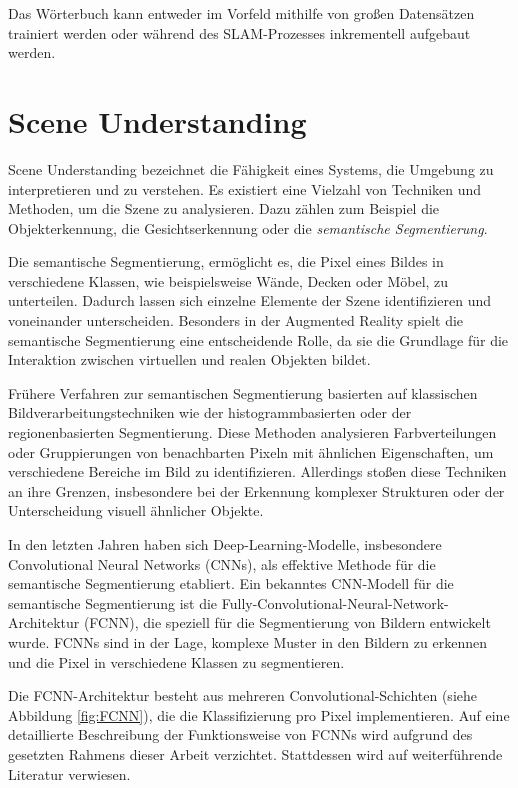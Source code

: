 Das Wörterbuch kann entweder im Vorfeld mithilfe von großen Datensätzen trainiert werden oder während des SLAM-Prozesses inkrementell aufgebaut werden. \cite{ta2023loopClosure, khan2015ibuild, gao2021vSLAM}

\section{Scene Understanding} \label{sec:SceneUnderstanding}

Scene Understanding bezeichnet die Fähigkeit eines Systems, die Umgebung zu interpretieren und zu verstehen. Es existiert eine Vielzahl von Techniken und Methoden, um die Szene zu analysieren. Dazu zählen zum Beispiel die Objekterkennung, die Gesichtserkennung oder die \emph{semantische Segmentierung}. \cite{szeliski2022computerVision}

Die semantische Segmentierung, ermöglicht es, die Pixel eines Bildes in verschiedene Klassen, wie beispielsweise Wände, Decken oder Möbel, zu unterteilen. Dadurch lassen sich einzelne Elemente der Szene identifizieren und voneinander unterscheiden. Besonders in der Augmented Reality spielt die semantische Segmentierung eine entscheidende Rolle, da sie die Grundlage für die Interaktion zwischen virtuellen und realen Objekten bildet. \cite{szeliski2022computerVision, appledevdoc, arcoredevdoc}

Frühere Verfahren zur semantischen Segmentierung basierten auf klassischen Bildverarbeitungstechniken wie der histogrammbasierten oder der regionenbasierten Segmentierung. Diese Methoden analysieren Farbverteilungen oder Gruppierungen von benachbarten Pixeln mit ähnlichen Eigenschaften, um verschiedene Bereiche im Bild zu identifizieren. Allerdings stoßen diese Techniken an ihre Grenzen, insbesondere bei der Erkennung komplexer Strukturen oder der Unterscheidung visuell ähnlicher Objekte. \cite{szeliski2022computerVision}

In den letzten Jahren haben sich Deep-Learning-Modelle, insbesondere Convolutional Neural Networks (CNNs), als effektive Methode für die semantische Segmentierung etabliert. Ein bekanntes CNN-Modell für die semantische Segmentierung ist die Fully-Convolutional-Neural-Network-Architektur (FCNN), die speziell für die Segmentierung von Bildern entwickelt wurde. FCNNs sind in der Lage, komplexe Muster in den Bildern zu erkennen und die Pixel in verschiedene Klassen zu segmentieren. \cite{long2014fcnn}

Die FCNN-Architektur besteht aus mehreren Convolutional-Schichten (siehe Abbildung \ref{fig:FCNN}), die die Klassifizierung pro Pixel implementieren. Auf eine detaillierte Beschreibung der Funktionsweise von FCNNs wird aufgrund des gesetzten Rahmens dieser Arbeit verzichtet. Stattdessen wird auf weiterführende Literatur verwiesen. \cite{long2014fcnn, ronneberger2015unet}


